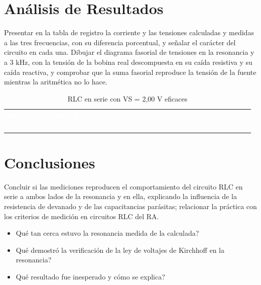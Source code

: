 \documentclass[12pt]{article}
\begin{document}
\section{Análisis de Resultados}\label{sec:analisis}
Presentar en la tabla de registro la corriente y las tensiones calculadas y medidas a las tres frecuencias, con su diferencia porcentual, y señalar el carácter del circuito en cada una.
\lineablanco
Dibujar el diagrama fasorial de tensiones en la resonancia y a 3 kHz, con la tensión de la bobina real descompuesta en su caída resistiva y su caída reactiva, y comprobar que la suma fasorial reproduce la tensión de la fuente mientras la aritmética no lo hace.
\begin{table}[H]
  \centering
  \caption{RLC en serie con VS = 2,00 V eficaces}
  \label{tab:registro-1}
  \begin{tabularx}{\linewidth}{>{\raggedright\arraybackslash}X>{\raggedright\arraybackslash}X>{\raggedright\arraybackslash}X>{\raggedright\arraybackslash}X>{\raggedright\arraybackslash}X>{\raggedright\arraybackslash}X}
    \rowcolor{iubnavy} \textcolor{white}{\textbf{Frecuencia (kHz)}} & \textcolor{white}{\textbf{I (mA)}} & \textcolor{white}{\textbf{VR (V)}} & \textcolor{white}{\textbf{Vbob (V)}} & \textcolor{white}{\textbf{VC (V)}} & \textcolor{white}{\textbf{Carácter}} \\
    \rule{0pt}{0.8cm} & & & & & \\
    \rowcolor{iubfondogris} \rule{0pt}{0.8cm} & & & & & \\
    \rule{0pt}{0.8cm} & & & & & \\
    \rowcolor{iubfondogris} \rule{0pt}{0.8cm} & & & & & \\
    \bottomrule
  \end{tabularx}
\end{table}

\section{Conclusiones}\label{sec:conclusiones}
Concluir si las mediciones reproducen el comportamiento del circuito RLC en serie a ambos lados de la resonancia y en ella, explicando la influencia de la resistencia de devanado y de las capacitancias parásitas; relacionar la práctica con los criterios de medición en circuitos RLC del RA.
\lineablanco
\begin{itemize}
  \item \textquestiondown{}Qué tan cerca estuvo la resonancia medida de la calculada?
  \item \textquestiondown{}Qué demostró la verificación de la ley de voltajes de Kirchhoff en la resonancia?
  \item \textquestiondown{}Qué resultado fue inesperado y cómo se explica?
\end{itemize}
\end{document}
